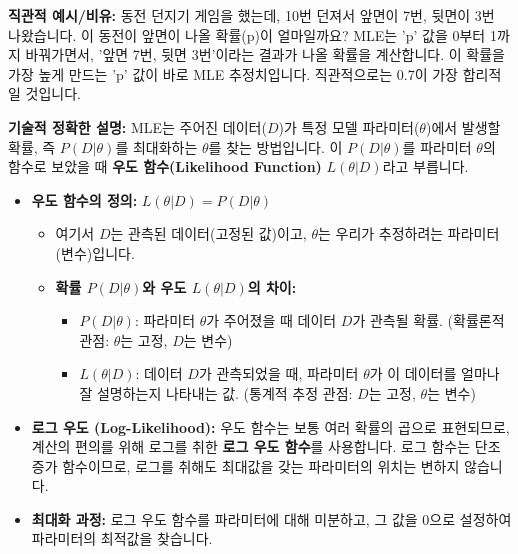 \documentclass[11pt,a4paper]{article}
\theoremstyle{definition}
\begin{document}
\textbf{직관적 예시/비유:}
동전 던지기 게임을 했는데, 10번 던져서 앞면이 7번, 뒷면이 3번 나왔습니다. 이 동전이 앞면이 나올 확률(p)이 얼마일까요? MLE는 'p' 값을 0부터 1까지 바꿔가면서, '앞면 7번, 뒷면 3번'이라는 결과가 나올 확률을 계산합니다. 이 확률을 가장 높게 만드는 'p' 값이 바로 MLE 추정치입니다. 직관적으로는 0.7이 가장 합리적일 것입니다.

\textbf{기술적 정확한 설명:}
MLE는 주어진 데이터($D$)가 특정 모델 파라미터($\theta$)에서 발생할 확률, 즉 $P(D|\theta)$를 최대화하는 $\theta$를 찾는 방법입니다. 이 $P(D|\theta)$를 파라미터 $\theta$의 함수로 보았을 때 \textbf{우도 함수(Likelihood Function)} $L(\theta|D)$라고 부릅니다.

\begin{itemize}
    \item \textbf{우도 함수의 정의:} $L(\theta|D) = P(D|\theta)$
        \begin{itemize}
            \item 여기서 $D$는 관측된 데이터(고정된 값)이고, $\theta$는 우리가 추정하려는 파라미터(변수)입니다.
            \item \textbf{확률 $P(D|\theta)$와 우도 $L(\theta|D)$의 차이:}
                \begin{itemize}
                    \item $P(D|\theta)$: 파라미터 $\theta$가 주어졌을 때 데이터 $D$가 관측될 확률. (확률론적 관점: $\theta$는 고정, $D$는 변수)
                    \item $L(\theta|D)$: 데이터 $D$가 관측되었을 때, 파라미터 $\theta$가 이 데이터를 얼마나 잘 설명하는지 나타내는 값. (통계적 추정 관점: $D$는 고정, $\theta$는 변수)
                \end{itemize}
        \end{itemize}
    \item \textbf{로그 우도 (Log-Likelihood):} 우도 함수는 보통 여러 확률의 곱으로 표현되므로, 계산의 편의를 위해 로그를 취한 \textbf{로그 우도 함수}를 사용합니다. 로그 함수는 단조 증가 함수이므로, 로그를 취해도 최대값을 갖는 파라미터의 위치는 변하지 않습니다.
    \item \textbf{최대화 과정:} 로그 우도 함수를 파라미터에 대해 미분하고, 그 값을 0으로 설정하여 파라미터의 최적값을 찾습니다.
\end{itemize}
\end{document}
